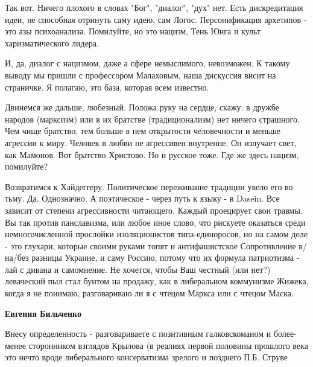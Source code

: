 \begin{itemize}
\begin{itemize}
Так вот. Ничего плохого в словах "Бог", "диалог", "дух" нет. Есть дискредитация
идеи, не способная отринуть саму идею, сам Логос. Персонификация архетипов -
это азы психоанализа. Помилуйте, но это нацизм, Тень Юнга и культ
харизматического лидера. 

И, да, диалог с нацизмом, даже а сфере немыслимого, невозможен. К такому выводу
мы пришли с профессором Малаховым, наша дискуссия висит на страничке. Я
полагаю, это база, которая всем известно. 

Двинемся же дальше, любезный. Положа руку на сердце, скажу: в дружбе народов
(марксизм) или в их братстве (традиционализм) нет ничего страшного. Чем чище
братство, тем больше в нем открытости человечности и меньше агрессии к миру.
Человек в любви не агрессивен внутренне. Он излучает свет, как Мамонов.  Вот
братство Христово. Но и русское тоже. Где же здесь нацизм, помилуйте?

Возвратимся к Хайдеггеру. Политическое переживание традиции увело его во тьму.
Да. Однозначно. А поэтическое - через путь к языку - в Dasein. Все зависит от
степени агрессивности читающего. Каждый проецирует свои травмы. Вы так против
панславизма, или любое иное слово, что рискуете оказаться среди
немногочисленной прослойки изоляционистов типа-единоросов, но на самом деле -
это глухари, которые своими руками топят и антифашистское Сопротивление
в/на/без разницы Украине, и саму Россию, потому что их формула патриотизма -
лай с дивана и самомнение. Не хочется, чтобы Ваш честный (или нет?) леваческий
пыл стал бунтом на продажу, как в либеральном коммунизме Жижека, когда я не
понимаю, разговариваю ли я с чтецом Маркса или с чтецом Маска.

 
\textbf{Евгения Бильченко} 

Внесу определенность - разговариваете с позитивным галковскоманом и более-менее
сторонником взглядов Крылова (в реалиях первой половины прошлого века это нечто
вроде либерального консерватизма зрелого и позднего П.Б. Струве


 

\end{itemize}
\end{itemize}
